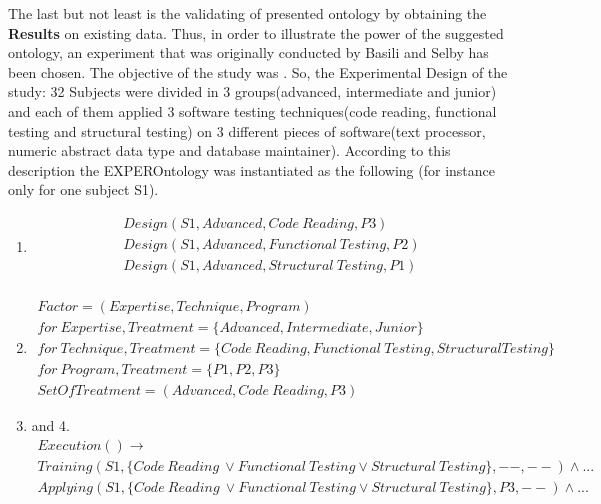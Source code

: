 	The last but not least is the validating of presented ontology by obtaining the \textbf{Results} on existing data. Thus, in order to illustrate the power of the suggested ontology, an experiment that was originally conducted by Basili and Selby\cite{Bas87} has been chosen. The objective of the study was \frqq\cite[abstract]{Bas87}. So, the Experimental Design of the study: 32 Subjects were divided in 3 groups(advanced, intermediate and junior) and  each of them applied 3 software testing techniques(code reading, functional testing and structural testing) on 3 different pieces of software(text processor, numeric abstract data type and database maintainer). According to this description the EXPEROntology was instantiated as the following (for instance only for one subject S1).
	\begin{enumerate}
		\item \begin{align*}
			Design(S1, Advanced, Code\ Reading, P3) \\
			Design(S1, Advanced, Functional\ Testing, P2) \\
			Design(S1, Advanced, Structural\ Testing, P1) \\
		\end{align*}
		\item \begin{align*}
			Factor = (Expertise, Technique, Program) \\
			for\ Expertise, Treatment = \{Advanced, Intermediate, Junior\} \\
			for\ Technique, Treatment = \{Code\ Reading, Functional\ Testing, Structural Testing\} \\
			for\ Program, Treatment = \{P1,P2,P3\} \\
			SetOfTreatment = {(Advanced, Code\ Reading, P3)}
		\end{align*}
		\item and 4.  
		\begin{align*}
			Execution() \rightarrow  \\
			Training(S1, \{Code\ Reading\ \lor Functional\ Testing \lor  Structural\ Testing\}, --, --) \land ... \\
			Applying(S1,\{Code\ Reading\ \lor Functional\ Testing \lor  Structural\ Testing\}, P3, --) \land ... \\
		\end{align*}
	\end{enumerate}
  
